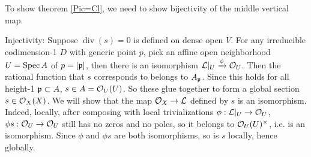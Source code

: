 \documentclass[11pt]{amsart}
\begin{document}
To show theorem \ref{Pic=Cl}, we need to show bijectivity of the middle vertical map. 

Injectivity: Suppose $\operatorname{div}(s) = 0$ is defined on dense open $V$. For any irreducible codimension-1 $D$ with generic point $p$, pick an affine open neighborhood $U = \operatorname{Spec} A$ of $p = [\mathfrak{p}]$, then there is an isomorphism $\mathcal{L}|_U\xrightarrow{\phi} \mathcal{O}_U$. Then the rational function that $s$ corresponds to belongs to $A_{\mathfrak{p}}$. Since this holds for all height-1 $\mathfrak{p}\subset A$, $s\in A = \mathcal{O}_U(U)$. So these glue together to form a global section $s\in \mathcal{O}_X(X)$. We will show that the map $\mathcal{O}_X\to \mathcal{L}$ defined by $s$ is an isomorphism. Indeed, locally, after composing with local trivializations $\phi: \mathcal{L}|_U\to \mathcal{O}_U$, $\phi s:\mathcal{O}_U\to \mathcal{O}_U$ still has no zeros and no poles, so it belongs to $\mathcal{O}_U(U)^\times$, i.e. is an isomorphism. Since $\phi$ and $\phi s$ are both isomorphisms, so is $s$ locally, hence globally.
\end{document}
